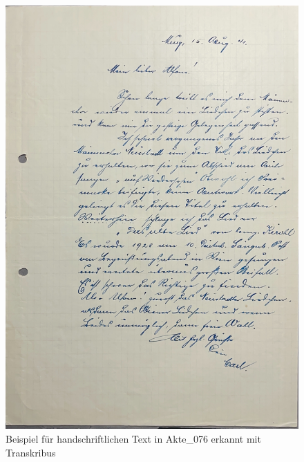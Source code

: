\documentclass[12pt, a4paper, ngerman, bidi=default]{article}
\begin{document}
\begin{figure}[htbp]
  \centering
  \includegraphics[width=\textwidth]{./assets/Images/Akte_076_S001.jpg}
  \caption{Beispiel für handschriftlichen Text in Akte\_076 erkannt mit Transkribus}
  \label{fig:transkribus-handschrift}
\end{figure}
\end{document}
